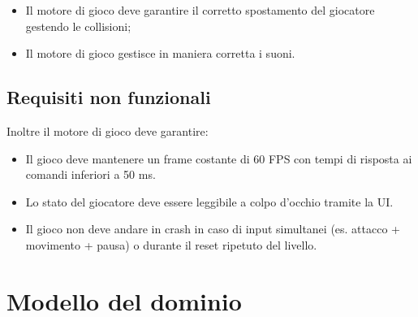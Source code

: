 \documentclass[a4paper, italian, 11pt, oneside]{report}
\begin{document}
\begin{itemize}
  \begin{itemize}
    \item Avviare una partita;
    \item Resettare una partita allo stato iniziale;
    \item Mettere in pausa la partita;
    \item Riprendere il gioco;
    \item Uscire dal gioco.
  \end{itemize}
  \item Il motore di gioco deve garantire il corretto spostamento del giocatore gestendo le collisioni;
  \item Il motore di gioco gestisce in maniera corretta i suoni.
\end{itemize}

\subsection{Requisiti non funzionali}
Inoltre il motore di gioco deve garantire:
\begin{itemize}
  \item Il gioco deve mantenere un frame costante di 60 FPS con tempi di risposta ai comandi inferiori a 50 ms.
  \item Lo stato del giocatore deve essere leggibile a colpo d'occhio tramite la UI.
  \item Il gioco non deve andare in crash in caso di input simultanei (es. attacco + movimento + pausa) o durante il reset ripetuto del livello.
\end{itemize}


\section{Modello del dominio}

\end{document}
